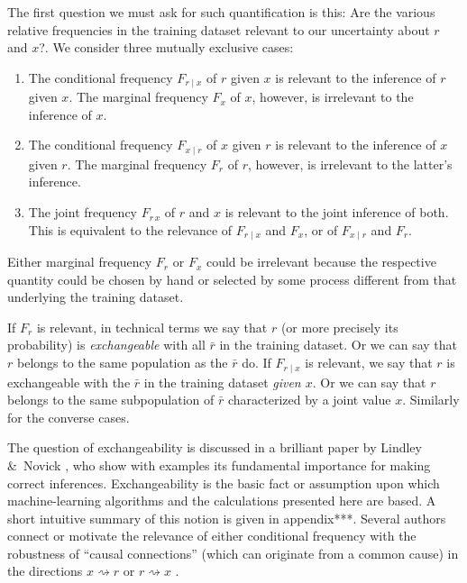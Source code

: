 \documentclass[\ifafour a4paper,12pt,\else a5paper,10pt,\fi%
onecolumn,oneside,article,%
british%
]{memoir}
\makeatletter
\theoremstyle{remark}
\theoremstyle{innote}
\newcommand*{\citey}{\parencites*}
\newcommand*{\amp}{\&}
\renewcommand*{\|}[1][]{\nonscript\:#1\vert\nonscript\:\mathopen{}}
\renewcommand*{\=}{\TextOrMath\texteq\eq}
\newcommand*{\sects}{\S\S}%
\newcommand*{\cf}{{cf.}}
\newcommand*{\ro}{r}
\newcommand*{\xo}{x}
\newcommand*{\br}{\bar{r}}
\newcommand*{\q}{}%
\DeclareRobustCommand*{\q}{%
  \mathord{\mathpalette\bigcdot@{}}%
}
\newcommand*{\bigcdot@scalefactor}{0.7}
\newcommand*{\bigcdot@widthfactor}{1.5}
\newcommand*{\bigcdot@}[2]{%
  \sbox0{$#1\vcenter{}$}%
  \sbox2{$#1\cdot\m@th$}%
  \hbox to \bigcdot@widthfactor\wd2{%
    \hfil
    \raise\ht0\hbox{%
      \scalebox{\bigcdot@scalefactor}{%
        \lower\ht0\hbox{$#1\bullet\m@th$}%
      }%
    }%
    \hfil
  }%
}
\makeatother
\begin{document}
The first question we must ask for such quantification is this: Are the
various relative frequencies in the training dataset relevant to our
uncertainty about $\ro$ and $\xo$?. We consider three mutually exclusive
cases:
\begin{enumerate}[label=\roman*.]
\item The conditional frequency $F_{\ro\mid \xo}$ of $\ro$ given $\xo$ is
  relevant to the inference of $\ro$ given $\xo$. The marginal frequency
  $F_{\q \xo}$ of $\xo$, however, is irrelevant to the inference of $\xo$.
\item The conditional frequency $F_{\xo\mid \ro}$ of $\xo$ given
  $\ro$ is relevant to the inference of $\xo$ given $\ro$. The
  marginal frequency $F_{\ro\q}$ of $\ro$, however, is irrelevant to
  the latter's inference.
\item The joint frequency $F_{\ro\, \xo}$ of $\ro$ and
  $\xo$ is relevant to the joint inference of both. This is equivalent to
  the relevance of $F_{\ro\mid \xo}$ and $F_{\q \xo}$, or of
  $F_{\xo\mid \ro}$ and $F_{\ro\q}$.
\end{enumerate}
Either marginal frequency $F_{r\q}$ or $F_{\q x}$ could be irrelevant
because the respective quantity could be chosen by hand or selected by some
process different from that underlying the training dataset.

If $F_{\ro\q}$ is relevant, in technical terms we say that $\ro$ (or more
precisely its probability) is \emph{exchangeable} with all $\br$ in the
training dataset. Or we can say that $\ro$ belongs to the same population
as the $\br$ do. If $F_{\ro\mid \xo}$ is relevant, we say that $\ro$ is
exchangeable with the $\br$ in the training dataset \emph{given $\xo$}. Or
we can say that $\ro$ belongs to the same subpopulation of $\br$
characterized by a joint value $\xo$. Similarly for the converse cases.

The question of exchangeability is discussed in a brilliant paper by
Lindley \amp\ Novick \citey{lindleyetal1981}, who show with examples its
fundamental importance for making correct inferences. Exchangeability is
the basic fact or assumption upon which machine-learning algorithms and the
calculations presented here are based. A short intuitive summary of this
notion is given in appendix***. Several authors connect or motivate the
relevance of either conditional frequency with the robustness of
\enquote{causal connections} (which can originate from a common cause) in
the directions $\xo \rightsquigarrow \ro$ or $\ro \rightsquigarrow \xo$
\parencites[\cf][\sects~2.1.2, 2.2.5]{pearl1988}.
\end{document}
